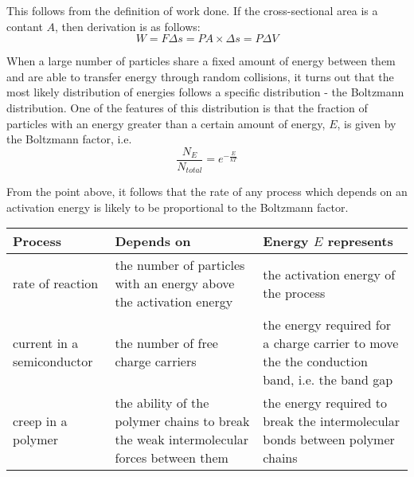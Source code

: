 \documentclass[main.tex]{subfiles}
\begin{document}

This follows from the definition of work done. If the cross-sectional area is a contant $A$, then derivation is as follows:
\[ W = F\Delta s = PA \times \Delta s = P\Delta V \]


When a large number of particles share a fixed amount of energy between them and are able to transfer energy through random collisions, it turns out that the most likely distribution of energies  follows a specific distribution - the Boltzmann distribution. One of the features of this distribution is that the fraction of particles with an energy greater than a certain amount of energy, $E$, is given by the Boltzmann factor, i.e.
\[ \frac{N_{E}}{N_{total}} = e^{-\frac{E}{kT}} \]

From the point above, it follows that the rate of any process which depends on an activation energy is likely to be proportional to the Boltzmann factor.

\begin{center}
  \begin{tabular}{p{3cm}p{4cm}p{4cm}}
    \textbf{Process} & \textbf{Depends on } & \textbf{Energy $E$ represents} \\ \hline \hline
    rate of reaction & the number of particles with an energy above the activation energy & the activation energy of the process \\ \hline
    current in a semiconductor & the number of free charge carriers & the energy required for a charge carrier to move the the conduction band, i.e. the band gap \\ \hline
    creep in a polymer & the ability of the polymer chains to break the weak intermolecular forces between them & the energy required to break the intermolecular bonds between polymer chains \\ \hline
  \end{tabular}
\end{center}

\end{document}
